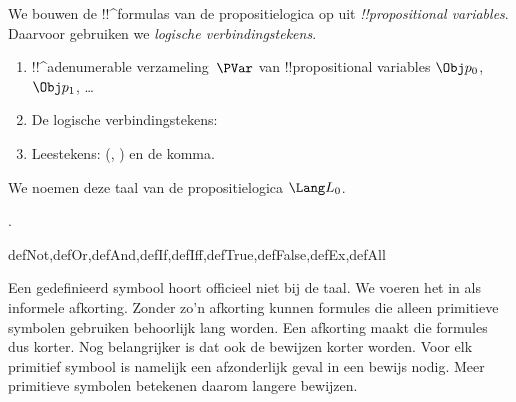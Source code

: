 \documentclass[../../../include/open-logic-section]{subfiles}
\begin{document}


We bouwen de !!^{formula}s van de propositielogica op uit
\emph{!!{propositional
    variable}s}. Daarvoor gebruiken
we \emph{logische verbindingstekens}.

\begin{enumerate}
\item !!^a{denumerable} verzameling~$\PVar$ van !!{propositional variable}s
  $\Obj p_0$, $\Obj p_1$, \dots
{}
\item De logische verbindingstekens:
  \startycommalist
\item Leestekens: (, ) en de komma.
\end{enumerate}

We noemen deze taal van de propositielogica $\Lang L_0$.

.

\begin{tagblock}{defNot,defOr,defAnd,defIf,defIff,defTrue,defFalse,defEx,defAll}
\begin{explain}
Een gedefinieerd symbool hoort officieel niet bij de taal. We voeren
het in als informele afkorting. Zonder zo'n afkorting kunnen formules
die alleen primitieve symbolen gebruiken behoorlijk lang worden. Een
afkorting maakt die formules dus korter. Nog belangrijker is dat ook
de bewijzen korter worden. Voor elk primitief symbool is namelijk een
afzonderlijk geval in een bewijs nodig. Meer primitieve symbolen
betekenen daarom langere bewijzen.
\end{explain}
\end{tagblock}
\end{document}
